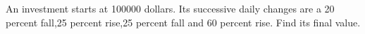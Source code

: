 An investment starts at 100000 dollars. Its successive daily changes are a 20 percent fall,25 percent rise,25 percent fall and 60 percent rise. Find its final value.
